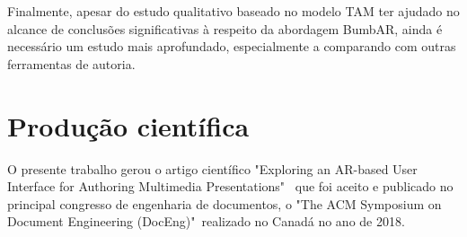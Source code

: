 \documentclass[../main.tex]{subfiles}
\begin{document}
Finalmente, apesar do estudo qualitativo baseado no modelo TAM ter ajudado no alcance de conclusões significativas à respeito da abordagem BumbAR, ainda é necessário um estudo mais aprofundado, especialmente a comparando com outras ferramentas de autoria.

\section{Produção científica}

O presente trabalho gerou o artigo científico "Exploring an AR-based User Interface for Authoring Multimedia Presentations"~\cite{mendes2018exploring} que foi aceito e publicado no principal congresso de engenharia de documentos, o "The ACM Symposium on Document Engineering (DocEng)"~realizado no Canadá no ano de 2018. 
\end{document}
